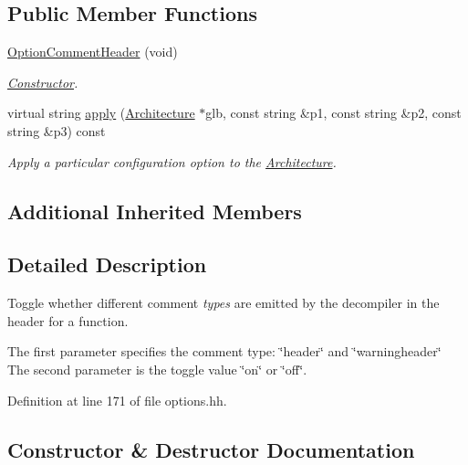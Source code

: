 \subsection*{Public Member Functions}
\begin{DoxyCompactItemize}
\item 
\mbox{\hyperlink{class_option_comment_header_a037afb14732823709bfd854662cbef8d}{Option\+Comment\+Header}} (void)
\begin{DoxyCompactList}\small\item\em \mbox{\hyperlink{class_constructor}{Constructor}}. \end{DoxyCompactList}\item 
virtual string \mbox{\hyperlink{class_option_comment_header_a9020b0d5fab12d14a6fb309c5306bac7}{apply}} (\mbox{\hyperlink{class_architecture}{Architecture}} $\ast$glb, const string \&p1, const string \&p2, const string \&p3) const
\begin{DoxyCompactList}\small\item\em Apply a particular configuration option to the \mbox{\hyperlink{class_architecture}{Architecture}}. \end{DoxyCompactList}\end{DoxyCompactItemize}
\subsection*{Additional Inherited Members}


\subsection{Detailed Description}
Toggle whether different comment {\itshape types} are emitted by the decompiler in the header for a function. 

The first parameter specifies the comment type\+: \char`\"{}header\char`\"{} and \char`\"{}warningheader\char`\"{} The second parameter is the toggle value \char`\"{}on\char`\"{} or \char`\"{}off\char`\"{}. 

Definition at line 171 of file options.\+hh.



\subsection{Constructor \& Destructor Documentation}
\mbox{\label{class_option_comment_header_a037afb14732823709bfd854662cbef8d}} 
